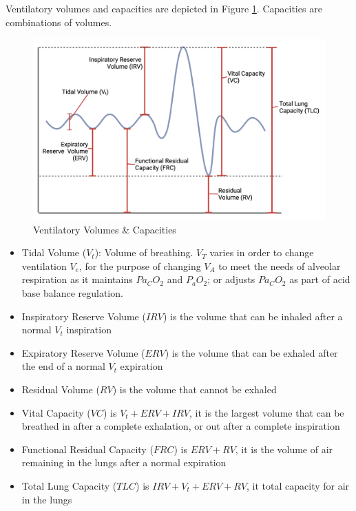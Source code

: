 Ventilatory volumes and capacities are depicted in Figure \ref{fig:ventilation_volumes}. Capacities are combinations of volumes.

\begin{figure}[!h]
    \centering
    \includegraphics[width=1.0 \linewidth]{./figure/ventilation_volumes.png}
    \caption{Ventilatory Volumes \& Capacities}
    \label{fig:ventilation_volumes}
\end{figure}

\begin{itemize}
    \item Tidal Volume ($V_t$): Volume of breathing. $V_T$ varies in order to change ventilation $V_e$, for the purpose of changing $V_A$ to meet the needs of alveolar respiration as it maintains $Pa_CO_2$ and $P_aO_2$; or adjusts $Pa_CO_2$ as part of acid base balance regulation.
    \item Inspiratory Reserve Volume ($IRV$) is the volume that can be inhaled after a normal $V_t$ inspiration
    \item Expiratory Reserve Volume ($ERV$) is the volume that can be exhaled after the end of a normal $V_t$ expiration
    \item Residual Volume ($RV$) is the volume that cannot be exhaled
    \item Vital Capacity ($VC$) is $V_t + ERV + IRV$, it is the largest volume that can be breathed in after a complete exhalation, or out after a complete inspiration
    \item Functional Residual Capacity ($FRC$) is $ERV + RV$, it is the volume of air remaining in the lungs after a normal expiration
    \item Total Lung Capacity ($TLC$) is $IRV + V_t + ERV + RV$, it total capacity for air in the lungs
\end{itemize}

